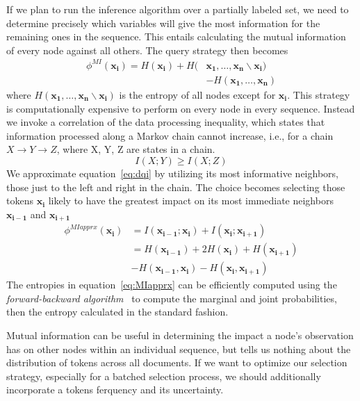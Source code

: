 If we plan to run the inference algorithm over a partially labeled set, we need to determine precisely which variables will give the most information for the remaining ones in the sequence. This entails calculating the mutual information of every node against all others. The query strategy then becomes
\begin{align}
\label{eq:dqi}
\phi^{MI}(\mathbf{x_{i}}) = H(\mathbf{x_{i}}) + H(&\mathbf{x_{1}}, \dots, \mathbf{x_{n}}\backslash\mathbf{x_{i}}) \nonumber\\
                                                                                    & - H(\mathbf{x_{1}}, \dots, \mathbf{x_{n}})
\end{align}
where $H(\mathbf{x_{1}}, \dots, \mathbf{x_{n}}\backslash\mathbf{x_{i}})$ is the entropy of all nodes except for $\mathbf{x_{i}}$. This strategy is computationally expensive to perform on every node in every sequence. Instead we invoke a correlation of the data processing inequality, which states that information processed along a Markov chain cannot increase, i.e., for a chain $X \rightarrow Y \rightarrow Z$, where X, Y, Z are states in a chain.
\begin{equation}
I(X;Y) \geq I(X;Z)
\end{equation}
We approximate equation~\ref{eq:dqi} by utilizing its most informative neighbors, those just to the left and right in the chain.  The choice becomes selecting those tokens $\mathbf{x_{i}}$ likely to have the greatest impact on its most immediate neighbors $\mathbf{x_{i-1}}$ and $\mathbf{x_{i+1}}$
\begin{align}
\label{eq:MIapprx}
\phi^{MIapprx}(\mathbf{x_{i}}) &= I(\mathbf{x_{i-1}};\mathbf{x_{i}}) + I(\mathbf{x_{i}};\mathbf{x_{i+1}}) \nonumber\\
                                                     &=  H(\mathbf{x_{i-1}}) + 2H(\mathbf{x_{i}}) + H(\mathbf{x_{i+1}}) \nonumber\\
                                                     &     -H(\mathbf{x_{i-1}},\mathbf{x_{i}}) - H(\mathbf{x_{i}},\mathbf{x_{i+1}})
\end{align}
The entropies in equation~\ref{eq:MIapprx} can be efficiently computed using the \textit{forward-backward algorithm}~\cite{Rabiner89atutorial} to compute the marginal and joint probabilities, then the entropy calculated in the standard fashion.

Mutual information can be useful in determining the impact a node's observation has on other nodes within an individual sequence, but tells us nothing about the distribution of tokens across all documents. If we want to optimize our selection strategy, especially for a batched selection process, we should additionally incorporate a tokens ferquency and its uncertainty.

